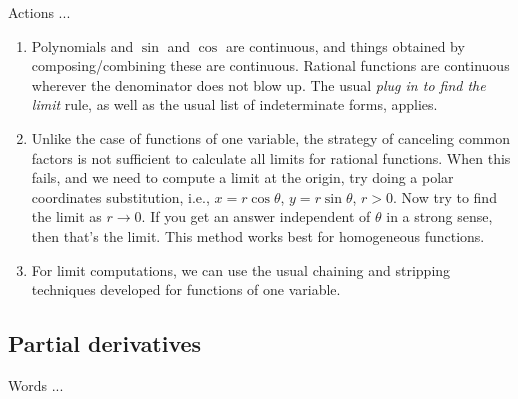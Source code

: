 \documentclass[10pt]{amsart}
\begin{document}
Actions ...

\begin{enumerate}
\item Polynomials and $\sin$ and $\cos$ are continuous, and things
  obtained by composing/combining these are continuous. Rational
  functions are continuous wherever the denominator does not blow
  up. The usual {\em plug in to find the limit} rule, as well as the
  usual list of indeterminate forms, applies.
\item Unlike the case of functions of one variable, the strategy of
  canceling common factors is not sufficient to calculate all limits
  for rational functions. When this fails, and we need to compute a
  limit at the origin, try doing a polar coordinates substitution,
  i.e., $x = r\cos \theta$, $y = r \sin \theta$, $r > 0$. Now try to
  find the limit as $r \to 0$. If you get an answer independent of
  $\theta$ in a strong sense, then that's the limit. This method works
  best for homogeneous functions.
\item For limit computations, we can use the usual chaining and
  stripping techniques developed for functions of one variable.
\end{enumerate}

\subsection{Partial derivatives}

Words ...
\end{document}
